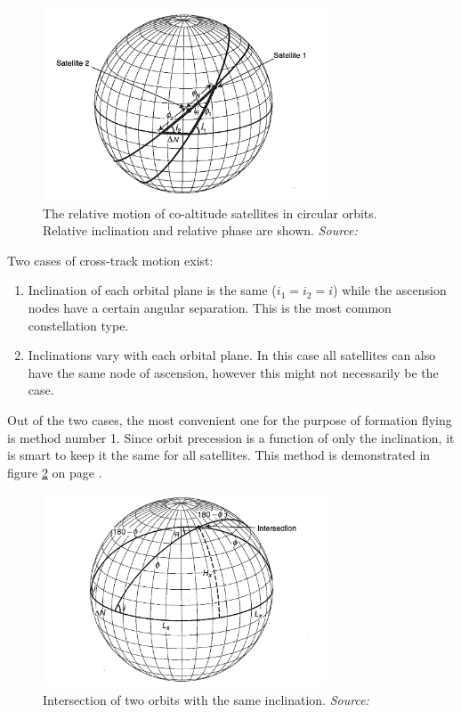 \begin{figure}[ht!]
\centering
\includegraphics[width=0.75\textwidth, angle=0]{chapters/img/relativeMotion.png}
\caption{The relative motion of co-altitude satellites in circular orbits. Relative inclination and relative phase are shown. \emph{Source: \cite{constDesign}}}
\label{fig:relativeMotion}
\end{figure}

Two cases of cross-track motion exist: 

\begin{enumerate}
	\item Inclination of each orbital plane is the same ($i_1 = i_2 = i$) while the ascension nodes have a certain angular separation. This is the most common constellation type.
	\item Inclinations vary with each orbital plane. In this case all satellites can also have the same node of ascension, however this might not necessarily be the case.
\end{enumerate}

Out of the two cases, the most convenient one for the purpose of formation flying is method number 1. Since orbit precession is a function of only the inclination, it is smart to keep it the same for all satellites. This method is demonstrated in figure \ref{fig:intersection} on page \pageref{fig:intersection}.

\begin{figure}[ht!]
\centering
\includegraphics[width=0.75\textwidth, angle=0]{chapters/img/intersection.png}

\caption{Intersection of two orbits with the same inclination. \emph{Source: \cite{constDesign}}}
\label{fig:intersection}
\end{figure}

